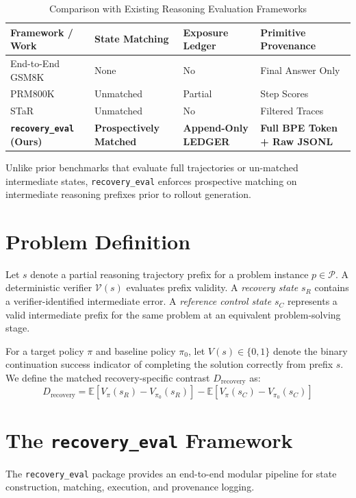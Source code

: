 \documentclass[10pt,conference]{IEEEtran}
\begin{document}
\begin{table}[htbp]
\caption{Comparison with Existing Reasoning Evaluation Frameworks}
\label{tab:literature}
\centering
\begin{tabular}{p{2.2cm}p{1.4cm}p{1.6cm}p{1.8cm}}
\toprule
\textbf{Framework / Work} & \textbf{State Matching} & \textbf{Exposure Ledger} & \textbf{Primitive Provenance} \\
\midrule
End-to-End GSM8K \cite{cobbe2021gsm8k} & None & No & Final Answer Only \\
PRM800K \cite{lightman2023process} & Unmatched & Partial & Step Scores \\
STaR \cite{zelikman2022star} & Unmatched & No & Filtered Traces \\
\textbf{\texttt{recovery\_eval} (Ours)} & \textbf{Prospectively Matched} & \textbf{Append-Only LEDGER} & \textbf{Full BPE Token + Raw JSONL} \\
\bottomrule
\end{tabular}
\end{table}

Unlike prior benchmarks that evaluate full trajectories or un-matched intermediate states, \texttt{recovery\_eval} enforces prospective matching on intermediate reasoning prefixes prior to rollout generation.

\section{Problem Definition}
Let $s$ denote a partial reasoning trajectory prefix for a problem instance $p \in \mathcal{P}$. A deterministic verifier $\mathcal{V}(s)$ evaluates prefix validity. 
A \textit{recovery state} $s_R$ contains a verifier-identified intermediate error. A \textit{reference control state} $s_C$ represents a valid intermediate prefix for the same problem at an equivalent problem-solving stage.

For a target policy $\pi$ and baseline policy $\pi_0$, let $V(s) \in \{0, 1\}$ denote the binary continuation success indicator of completing the solution correctly from prefix $s$. We define the matched recovery-specific contrast $D_{\text{recovery}}$ as:
\begin{equation}
D_{\text{recovery}} = \mathbb{E}[V_{\pi}(s_R) - V_{\pi_0}(s_R)] - \mathbb{E}[V_{\pi}(s_C) - V_{\pi_0}(s_C)]
\end{equation}

\section{The \texttt{recovery\_eval} Framework}
The \texttt{recovery\_eval} package provides an end-to-end modular pipeline for state construction, matching, execution, and provenance logging.
\end{document}
